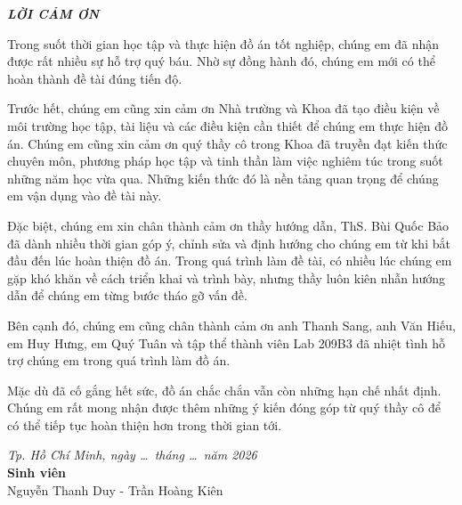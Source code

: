 {}
\thispagestyle{empty}

\begin{center}
    {\Large\textbf{\textit{\textcolor{LoiCamOnTitleColor}{LỜI CẢM ƠN}}}}
\end{center}

\vspace{1.5em}

Trong suốt thời gian học tập và thực hiện đồ án tốt nghiệp, chúng em đã nhận được rất nhiều sự hỗ trợ quý báu. Nhờ sự đồng hành đó, chúng em mới có thể hoàn thành đề tài đúng tiến độ.

Trước hết, chúng em cũng xin cảm ơn Nhà trường và Khoa đã tạo điều kiện về môi trường học tập, tài liệu và các điều kiện cần thiết để chúng em thực hiện đồ án. Chúng em cũng xin cảm ơn quý thầy cô trong Khoa đã truyền đạt kiến thức chuyên môn, phương pháp học tập và tinh thần làm việc nghiêm túc trong suốt những năm học vừa qua. Những kiến thức đó là nền tảng quan trọng để chúng em vận dụng vào đề tài này.

Đặc biệt, chúng em xin chân thành cảm ơn thầy hướng dẫn, ThS. Bùi Quốc Bảo đã dành nhiều thời gian góp ý, chỉnh sửa và định hướng cho chúng em từ khi bắt đầu đến lúc hoàn thiện đồ án. Trong quá trình làm đề tài, có nhiều lúc chúng em gặp khó khăn về cách triển khai và trình bày, nhưng thầy luôn kiên nhẫn hướng dẫn để chúng em từng bước tháo gỡ vấn đề.

Bên cạnh đó, chúng em cũng chân thành cảm ơn anh Thanh Sang, anh Văn Hiếu, em Huy Hưng, em Quý Tuân và tập thể thành viên Lab 209B3 đã nhiệt tình hỗ trợ chúng em trong quá trình làm đồ án.

Mặc dù đã cố gắng hết sức, đồ án chắc chắn vẫn còn những hạn chế nhất định. Chúng em rất mong nhận được thêm những ý kiến đóng góp từ quý thầy cô để có thể tiếp tục hoàn thiện hơn trong thời gian tới.

\vfill

\begin{flushright}
    \textit{Tp. Hồ Chí Minh, ngày \ldots\ tháng \ldots\ năm 2026}\\[0.5em]
    \textbf{Sinh viên}\\[1em]
    Nguyễn Thanh Duy - Trần Hoàng Kiên
\end{flushright}
